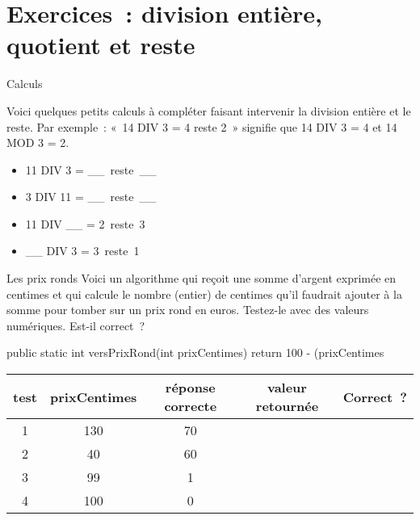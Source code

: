 \clearpage
\section{Exercices~: division entière, quotient et reste}

\begin{Exercice}{Calculs}

	Voici quelques petits calculs à compléter faisant intervenir la division entière
	et le reste.  Par exemple~: «~14 DIV 3 = 4 reste 2~» signifie que 14 DIV 3 = 4 et
	14 MOD 3 = 2.

	\begin{multicols}{2}
		\begin{itemize}
			\item 11 DIV 3 = \_\_\ reste\ \_\_
			\item 3 DIV 11 = \_\_\ reste\ \_\_
			\item 11 DIV \_\_ = 2\ reste\ 3
			\item \_\_ DIV 3 = 3\ reste\ 1
		\end{itemize}
	\end{multicols}
\end{Exercice}

\begin{Exercice}{Les prix ronds}
	Voici un algorithme qui reçoit une somme d’argent exprimée en centimes
	et qui calcule le nombre (entier) de centimes qu’il
	faudrait ajouter à la somme pour tomber sur un prix rond en euros.
	Testez-le avec des valeurs numériques. Est-il correct~?

\begin{java}
public static int versPrixRond(int prixCentimes){
	return 100 - (prixCentimes %
}
\end{java}

\begin{center}
	\begin{tabular}{|c|c|c|c|c|}
		\hline
		test \no & prixCentimes & réponse correcte & valeur retournée & Correct~? \\\hline
		\hline 
		1 & 130 & 70 &  & \\\hline
		2 & 40  & 60 &  & \\\hline
		3 & 99  & 1  &  & \\\hline
		4 & 100 & 0  &  & \\\hline
	\end{tabular}
\end{center}

\end{Exercice}

